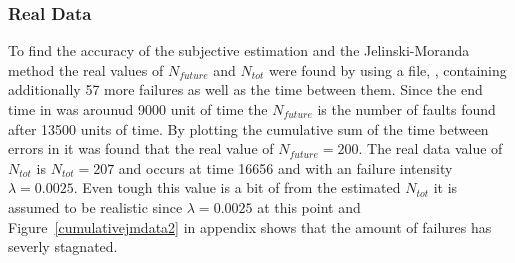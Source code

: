 \subsubsection*{Real Data}
\label{realdatajm}
To find the accuracy of the subjective estimation and the Jelinski-Moranda method the real values of $N_{future}$ and $N_{tot}$ were found by using a file, , containing additionally 57 more failures as well as the time between them. Since the end time in  was arounud 9000 unit of time the $N_{future}$ is the number of faults found after 13500 units of time. By plotting the cumulative sum of the time between errors in  it was found that the real value of $N_{future}=200$. The real data value of $N_{tot}$ is $N_{tot}=207$ and occurs at time 16656 and with an failure intensity $\lambda=0.0025$. Even tough this value is a bit of from the estimated $N_{tot}$ it is assumed to be realistic since $\lambda=0.0025$ at this point and Figure~\ref{cumulativejmdata2} in appendix shows that the amount of failures has severly stagnated.


